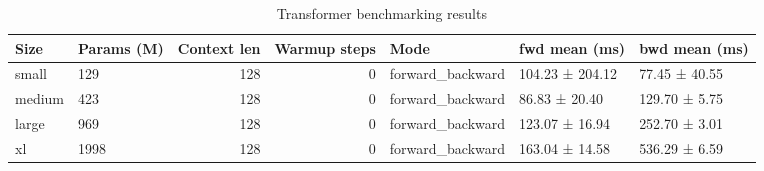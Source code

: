 \begin{table}
\caption{Transformer benchmarking results}
\label{tab:benchmarks}
\begin{tabular}{llrrlll}
\toprule
Size & Params (M) & Context len & Warmup steps & Mode & fwd mean (ms) & bwd mean (ms) \\
\midrule
small & 129 & 128 & 0 & forward_backward & 104.23 ± 204.12 & 77.45 ± 40.55 \\
medium & 423 & 128 & 0 & forward_backward & 86.83 ± 20.40 & 129.70 ± 5.75 \\
large & 969 & 128 & 0 & forward_backward & 123.07 ± 16.94 & 252.70 ± 3.01 \\
xl & 1998 & 128 & 0 & forward_backward & 163.04 ± 14.58 & 536.29 ± 6.59 \\
\bottomrule
\end{tabular}
\end{table}
